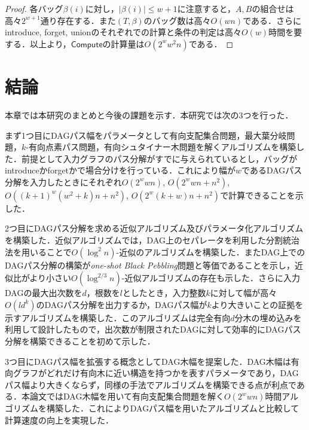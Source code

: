 \documentclass[master]{kuisthesis}		%
\theoremstyle{plain}
\theoremstyle{definition}
\begin{document}
\begin{proof}
    各バッグ$\beta(i)$に対し，$|\beta(i)| \leq w+1$に注意すると，$A, B$の組合せは高々$2^{w+1}$通り存在する．また$(T, \beta)$のバッグ数は高々$O(wn)$である．さらにintroduce, forget, unionのそれぞれでの計算と条件の判定は高々$O(w)$時間を要する．以上より，$\mathsf{Compute}$の計算量は$O(2^ww^2n)$である．
\end{proof}





















\section{結論} %
本章では本研究のまとめと今後の課題を示す．本研究では次の3つを行った．

まず1つ目にDAGパス幅をパラメータとして有向支配集合問題，最大葉分岐問題，$k$-有向点素パス問題，有向シュタイナー木問題を解くアルゴリズムを構築した．前提として入力グラフのパス分解がすでに与えられているとし，バッグがintroduceかforgetかで場合分けを行っている．これにより幅が$w$であるDAGパス分解を入力したときにそれぞれ$O(2^w w n)$, $O(2^w w n + n^2)$, $O((k+1)^w(w^2+k)n+n^2)$, $O(2^w (k + w)n + n^2)$で計算できることを示した．

2つ目にDAGパス分解を求める近似アルゴリズム及びパラメータ化アルゴリズムを構築した．近似アルゴリズムでは，DAG上のセパレータを利用した分割統治法を用いることで$O(\log^2 n)$-近似のアルゴリズムを構築した．またDAG上でのDAGパス分解の構築が\textit{one-shot Black Pebbling}問題と等価であることを示し，近似比がより小さい$O(\log^{2/3} n)$-近似アルゴリズムの存在も示した．さらに入力DAGの最大出次数を$d$，根数を$l$としたとき，入力整数$k$に対して幅が高々$O(ld^k)$のDAGパス分解を出力するか，DAGパス幅が$k$より大きいことの証拠を示すアルゴリズムを構築した．このアルゴリズムは完全有向$d$分木の埋め込みを利用して設計したもので，出次数が制限されたDAGに対して効率的にDAGパス分解を構築できることを初めて示した．

3つ目にDAGパス幅を拡張する概念としてDAG木幅を提案した．DAG木幅は有向グラフがどれだけ有向木に近い構造を持つかを表すパラメータであり，DAGパス幅より大きくならず，同様の手法でアルゴリズムを構築できる点が利点である．本論文ではDAG木幅を用いて有向支配集合問題を解く$O(2^w w n)$時間アルゴリズムを構築した．これによりDAGパス幅を用いたアルゴリズムと比較して計算速度の向上を実現した．
\end{document}
